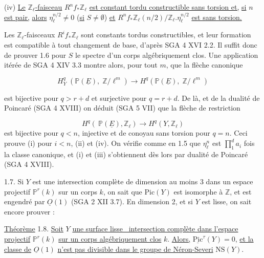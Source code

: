 (iv) \underline{Le} $\mathbb{Z}_\ell$\underline{-faisceau} $R^n f_* \mathbb{Z}_\ell$ \underline{est constant tordu constructible sans torsion et,} \underline{si} $n$ \underline{est pair,} \underline{alors} $\eta_\ell^{n/2} \neq 0$ (\underline{si} $S \neq \emptyset$) \underline{et} $R^n f_* \mathbb{Z}_\ell(n/2)/ \mathbb{Z}_\ell . \eta_\ell^{n/2}$ \underline{est sans torsion.}

Les $\mathbb{Z}_\ell$-faisceaux $R^i f_* \mathbb{Z}_\ell$ sont constants tordus constructibles, et leur formation est compatible à tout changement de base, d'après SGA 4 XVI 2.2. Il suffit donc de prouver 1.6 pour $S$ le spectre d'un corps algébriquement clos. Une application itérée de SGA 4 XIV 3.3 montre alors, pour tout $m$, que la flèche canonique

\begin{equation*}
H^q_Y \; (\mathbb{P}(\underline{E}), \; \mathbb{Z}/\ell^m) \longrightarrow H^q(\mathbb{P}(\underline{E}), \; \mathbb{Z}/\ell^m)
\end{equation*}

est bijective pour $q > r + d$ et surjective pour $q = r + d$. De là, et de la dualité de Poincaré (SGA 4 XVIII) on déduit (SGA 5 VII) que la flèche de restriction

\begin{equation*}
H^q(\ \mathbb{P}(\underline{E}), \mathbb{Z}_\ell) \longrightarrow H^q(Y, \mathbb{Z}_\ell)
\end{equation*}
est bijective pour $q < n$, injective et de conoyau sans torsion pour $q = n$. Ceci prouve (i) pour $i < n$, (ii) et (iv). On vérifie comme en 1.5 que $\eta_\ell^n$ est $\prod_1^d a_i$ fois la classe canonique, et (i) et (iii) s'obtiennent dès lors par dualité de Poincaré (SGA 4 XVIII).

1.7. Si $Y$ est une intersection complète de dimension au moins 3 dans un espace projectif $\mathbb{P}^r(k)$ sur un corps $k$, on sait que $\mathrm{Pic}(Y)$ est isomorphe à $\mathbb{Z}$, et est engendré par $\underline{O}(1)$ (SGA 2 XII 3.7). En dimension 2, et si $Y$ est lisse, on sait encore prouver :

\underline{Théorème} 1.8. \underline{Soit} $Y$ \underline{une surface lisse \ intersection complète dans l'espace projectif} $\mathbb{P}^r(k)$ \underline{sur un corps algébriquement clos} $k$. \underline{Alors,} $\underline{\mathrm{Pic}}^\tau(Y) = 0$, \underline{et la classe de} $\underline{O}(1)$ \underline{n'est pas divisible dans le groupe de Néron-Severi} $\mathrm{NS}(Y)$.

